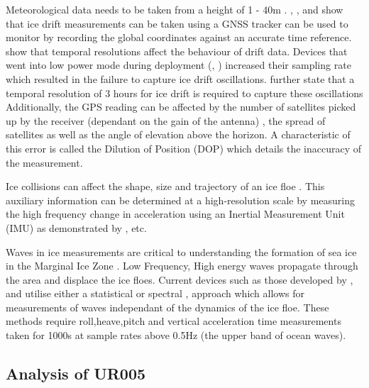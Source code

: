 Meteorological data needs to be taken from a height of 1 - 40m \cite{worldmeteorologicalorganization_2010}. \textcite{trident}, \textcite{uptempo}, \textcite{kohout2015device} and \textcite{albarello2020drift} show that ice drift measurements can be taken using a GNSS tracker can be used to monitor by recording the global coordinates against an accurate time reference. \textcite{alberello2019drift} show that temporal resolutions affect the behaviour of drift data. Devices that went into low power mode during deployment (\cite{vichi2019effects}, \cite{alberello2019drift}) increased their sampling rate which resulted in the failure to capture ice drift oscillations. \textcite{albarello2020drift} further state that a temporal resolution of 3 hours for ice drift is required to capture these oscillations Additionally, the GPS reading can be affected by the number of satellites picked up by the receiver (dependant on the gain of the antenna) \cite{spilker1996global}, the spread of satellites as well as the angle of elevation above the horizon. A characteristic of this error is called the Dilution of Position (DOP) which details the inaccuracy of the measurement.\par 

Ice collisions can affect the shape, size and trajectory of an ice floe \cite{womack_2020}. This auxiliary information can be determined at a high-resolution scale by measuring the  high frequency change in acceleration using an Inertial Measurement Unit (IMU) as demonstrated by \cite{thomson2012wave}, \cite{kohout2015device} etc. \par 

Waves in ice measurements are critical to understanding the formation of sea ice in the Marginal Ice Zone \cite{alberello2019drift}. Low Frequency, High energy waves propagate through the area and displace the ice floes\cite{womack_2020}. Current devices such as those developed by \cite{rabault2017measurements}, \cite{thomson2012wave} and \cite{kohout2015device} utilise either a statistical \cite{kuik1988method} or   spectral \cite{earle1996nondirectional},\cite{welch1967use} approach which allows for measurements of waves independant of the dynamics of the ice floe. These methods require roll,heave,pitch and vertical acceleration time measurements taken for 1000s at sample rates above 0.5Hz (the upper band of ocean waves)\cite{earle1996nondirectional}. \par 

\subsection{Analysis of UR005}

